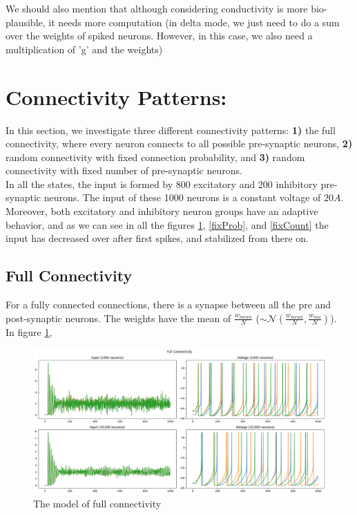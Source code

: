 \documentclass{article}
\begin{document}
	We should also mention that although considering conductivity is more bio-plausible, it needs more computation (in delta mode, we just need to do a sum over the weights of spiked neurons. However, in this case, we also need a multiplication of 'g' and the weights)
	
	\section{Connectivity Patterns:}
	In this section, we investigate three different connectivity patterns: \textbf{1)} the full connectivity, where every neuron connects to all possible pre-synaptic neurons, \textbf{2)} random connectivity with fixed connection probability, and \textbf{3)} random connectivity with fixed number of pre-synaptic neurons.\\
	In all the states, the input is formed by 800 excitatory and 200 inhibitory pre-synaptic neurons. The input of these 1000 neurons is a constant voltage of $20A$. Moreover, both excitatory and inhibitory neuron groups have an adaptive behavior, and as we can see in all the figures \ref{fullCon}, \ref{fixProb}, and \ref{fixCount} the input has decreased over after first spikes, and stabilized from there on.
	
	\subsection{Full Connectivity}
	For a fully connected connections, there is a synapse between all the pre and post-synaptic neurons. The weights have the mean of $\frac{w_{mean}}{N}$ ($\sim \mathcal{N}(\frac{w_{mean}}{N}, \frac{w_{mu}}{N})$). \\
	In figure \ref{fullCon}, 
	
	\begin{figure}[h]
		\includegraphics[width=1.2\textwidth]{fullCon.png}
		\caption{The model of full connectivity}
		\label{fullCon}
	\end{figure}
\end{document}
